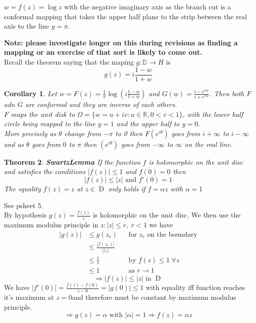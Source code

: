\documentclass{article}
\newtheorem{theorem}{Theorem}[section]
\newtheorem{corollary}[theorem]{Corollary}
\newenvironment{proof}[1][Proof]{\begin{trivlist}
\item[\hskip \labelsep {\bfseries #1}]}{\end{trivlist}}
\newenvironment{example}[1][Example]{\begin{trivlist}
\item[\hskip \labelsep {\bfseries #1}]}{\end{trivlist}}
\newcommand{\R}{\mathbb{R}}
\begin{document}
\begin{example}
    $w=f(z)=\log z$ with the negative imaginary axis as the branch cut is a conformal mapping that takes the upper
    half plane to the strip between the real axis to the line $y = \pi$.
\end{example}
\textbf{Note: please investigate longer on this during revisions as finding a mapping or an exercise of
that sort is likely to come out.}\\

Recall the theorem saying that the maping $g : \mathbb{D} \rightarrow H$ is
\[ g(z) = i\frac{1-w}{1+w} \]

\begin{corollary}
    Let $w = F(z) = \frac{1}{\pi}\log \left(i\frac{1-w}{1+w}\right)$ and $G(w) = \frac{i-e^{\pi w}}{i+e^{\pi w}}$.
    Then both $F$ adn $G$ are conformal and they are inverse of each others.\\
    $F$ maps the unit disk to $\Omega = \{ w= u+iv: u\in\R, 0<v<1 \}$, with the lower half circle being mapped to
    the line $y = 1$ and the upper half to $y=0$.\\
    More precisely as $\theta$ change from $-\pi$ to 0 then $F(e^{i\theta})$ goes from $i + \infty$ to $i - \infty$
    and as $\theta$ goes from $0$ to $\pi$ then $(e^{i\theta})$ goes from $-\infty$ to $\infty$ on the real line.
\end{corollary}

\begin{theorem} \label{SwartzLemma} \textbf{SwartzLemma}
    If the function $f$ is holomorphic on the unit disc and satisfies the conditions $|f(z)| \leq 1$ and $f(0) = 0$ then
    \[ |f(z)| \leq |z| \text{ and } f'(0) = 1\]
    The equality $f(z) = z$ at $z \in \mathop{D}$ only holds if $f = \alpha z$ with $\alpha = 1$
\end{theorem}
\begin{proof}
    See psheet 5.\\
    By hypothesis $g(z) = \frac{f(z)}{z}$ is holomorphic on the unit disc.
    We then use the maximum modulus principle in $z: |z| \leq r, \; r < 1$ we have
    \begin{align*}
        |g(z)|
            &\leq g(z_r) &&\text{for } z_r \text{ on the boundary}\\
            &\leq \frac{|f(z_r)|}{|z_r|}\\
            &\leq \frac{1}{r} &&\text{by } f(z) \leq 1 \; \forall z\\
            &\leq 1 && \text{as } r\rightarrow 1
    \end{align*}
    \[ \Rightarrow |f(z)| \leq |z| \text{ in } \mathop{D} \]
    We have $|f'(0)| = \frac{f(z) - f(0)}{z - 0} = |g(0)| \leq 1$ with equality
    iff function reaches it's maximum at $z = 0$and therefore must be constant by
    maximum modulus principle.
    \[ \Rightarrow g(z) = \alpha \text{ with } |\alpha| = 1 \Rightarrow f(z) = \alpha z \]
\end{proof}
\end{document}
